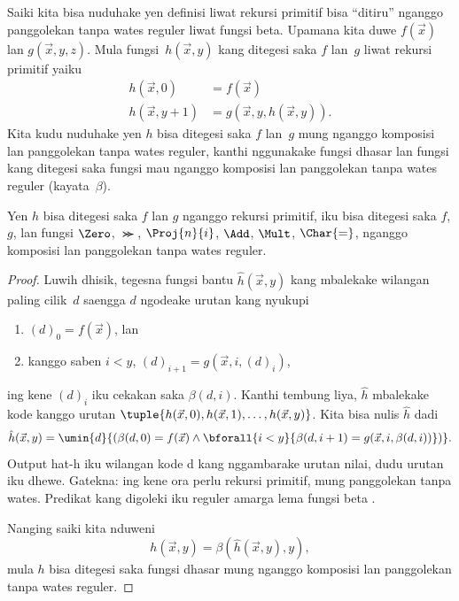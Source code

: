 \documentclass[../../../include/open-logic-section]{subfiles}
\begin{document}

Saiki kita bisa nuduhake yen definisi liwat rekursi primitif bisa
``ditiru'' nganggo panggolekan tanpa wates reguler liwat fungsi beta.
Upamana kita duwe $f(\vec x)$ lan $g(\vec x, y, z)$. Mula fungsi~$h(\vec x,y)$ kang ditegesi saka $f$ lan~$g$ liwat rekursi primitif yaiku
\begin{align*}
h(\vec x, 0) & =  f(\vec x) \\
h(\vec x, y+1) & =  g(\vec x, y, h(\vec x, y)).
\end{align*}
Kita kudu nuduhake yen $h$ bisa ditegesi saka $f$ lan~$g$ mung nganggo
komposisi lan panggolekan tanpa wates reguler, kanthi nggunakake
fungsi dhasar lan fungsi kang ditegesi saka fungsi mau nganggo
komposisi lan panggolekan tanpa wates reguler (kayata~$\beta$).

\begin{lem}
Yen $h$ bisa ditegesi saka $f$ lan $g$ nganggo rekursi primitif, iku
bisa ditegesi saka $f$, $g$, lan fungsi $\Zero$, $\Succ$,
$\Proj{n}{i}$, $\Add$, $\Mult$, $\Char{=}$, nganggo komposisi lan
panggolekan tanpa wates reguler.
\end{lem}

\begin{proof}
Luwih dhisik, tegesna fungsi bantu $\hat h(\vec x, y)$ kang mbalekake
wilangan paling cilik~$d$ saengga $d$ ngodeake urutan kang nyukupi
\begin{enumerate}
\item $(d)_0 = f(\vec x)$, lan
\item kanggo saben $i < y$, $(d)_{i+1} = g(\vec x, i, (d)_i)$,
\end{enumerate}
ing kene $(d)_i$ iku cekakan saka $\beta(d,i)$. Kanthi tembung liya, $\hat h$
mbalekake kode kanggo urutan $\tuple{h(\vec x, 0), h(\vec x, 1), \dots, h(\vec
x, y)}$. Kita bisa nulis $\hat h$ dadi
\[
\hat h(\vec x, y) = \umin{d}{(\beta(d,0) = f(\vec x) \land \bforall{i <
  y}{\beta(d,i+1) = g(\vec x, i,\beta(d,i))})}.
\]
Output hat-h iku wilangan kode d kang nggambarake urutan nilai, dudu urutan iku dhewe.
Gatekna: ing kene ora perlu rekursi primitif, mung panggolekan tanpa wates. Predikat
kang digoleki iku reguler amarga lema fungsi beta
.

Nanging saiki kita nduweni
\[
h(\vec x, y) = \beta(\hat h(\vec x, y), y),
\]
mula $h$ bisa ditegesi saka fungsi dhasar mung nganggo komposisi
lan panggolekan tanpa wates reguler.
\end{proof}
\end{document}
